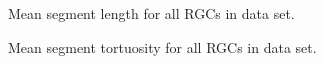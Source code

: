 \documentclass{article}
\begin{document}
\begin{figure}
  \centering
  \caption{Mean segment length for all RGCs in data set.}
\end{figure}

\clearpage

\begin{figure}
  \centering
  \caption{Mean segment tortuosity for all RGCs in data set.}
\end{figure}

\clearpage
\end{document}

